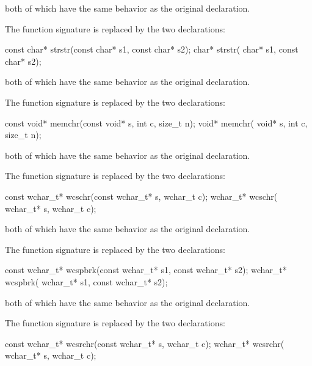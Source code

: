 \pnum
both of which have the same behavior as the original declaration.

\pnum
{}%
The function signature
is replaced by the two declarations:

\begin{codeblock}
const char* strstr(const char* s1, const char* s2);
      char* strstr(      char* s1, const char* s2);
\end{codeblock}

\pnum
both of which have the same behavior as the original declaration.

\pnum
{}%
The function signature
is replaced by the two declarations:

\begin{codeblock}
const void* memchr(const void* s, int c, size_t n);
      void* memchr(      void* s, int c, size_t n);
\end{codeblock}

\pnum
both of which have the same behavior as the original declaration.

\pnum
{}%
The function signature
is replaced by the two declarations:

\begin{codeblock}
const wchar_t* wcschr(const wchar_t* s, wchar_t c);
      wchar_t* wcschr(      wchar_t* s, wchar_t c);
\end{codeblock}

\pnum
both of which have the same behavior as the original declaration.

\pnum
{}%
The function signature
is replaced by the two declarations:

\begin{codeblock}
const wchar_t* wcspbrk(const wchar_t* s1, const wchar_t* s2);
      wchar_t* wcspbrk(      wchar_t* s1, const wchar_t* s2);
\end{codeblock}

\pnum
both of which have the same behavior as the original declaration.

\pnum
{}%
The function signature
is replaced by the two declarations:

\begin{codeblock}
const wchar_t* wcsrchr(const wchar_t* s, wchar_t c);
      wchar_t* wcsrchr(      wchar_t* s, wchar_t c);
\end{codeblock}

